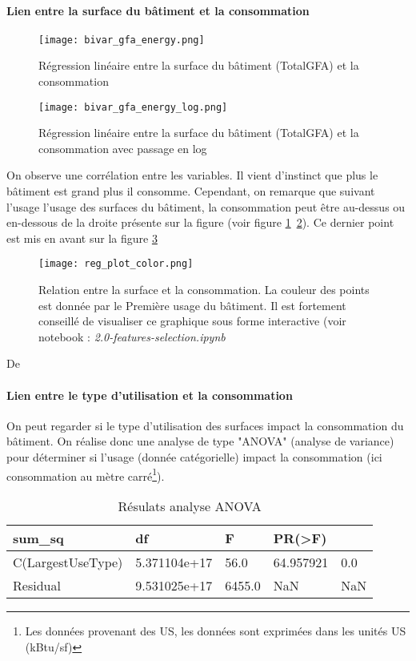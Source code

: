 \paragraph{Lien entre la surface du bâtiment et la consommation}

\begin{figure}[h!]
  \texttt{[image: bivar\_gfa\_energy.png]}
  \caption{Régression linéaire entre la surface du bâtiment (TotalGFA) et la
  consommation}
  \label{reg_1}
\end{figure}

\begin{figure}[h!]
  \texttt{[image: bivar\_gfa\_energy\_log.png]}
  \caption{Régression linéaire entre la surface du bâtiment (TotalGFA) et la
  consommation avec passage en log}
  \label{reg_2}
\end{figure}

On observe une corrélation entre les variables. Il vient d'instinct que plus
le bâtiment est grand plus il consomme. Cependant, on remarque que suivant l'usage
l'usage des surfaces du bâtiment, la consommation peut être au-dessus ou en-dessous
de la droite présente sur la figure (voir figure \ref{reg_1} \ref{reg_2}). Ce
dernier point est mis en avant sur la figure \ref{reg_3}

\begin{figure}[H]
  \texttt{[image: reg\_plot\_color.png]}
  \caption{Relation entre la surface et la consommation. La couleur des points
  est donnée par le Première usage du bâtiment. Il est fortement conseillé
  de visualiser ce graphique sous forme interactive (voir notebook : \emph{2.0-features-selection.ipynb}}
  \label{reg_3}
\end{figure}


De
\paragraph{Lien entre le type d'utilisation et la consommation}
On peut regarder si le type d'utilisation des surfaces impact la consommation du bâtiment.
On réalise donc une analyse de type "ANOVA" \cite{rutherford2001introducing}(analyse de variance) pour déterminer
si l'usage (donnée catégorielle) impact la consommation (ici consommation au mètre carré\footnote{Les données provenant des US, les données sont exprimées dans les unités US (kBtu/sf)}).

\begin{table*}[p]
  \caption{Résulats analyse ANOVA}
\begin{tabular}{@{}lllll@{}}
\toprule
sum\_sq                   & df           & F      & PR(\textgreater{}F) &     \\ \midrule
C(LargestUseType) & 5.371104e+17 & 56.0   & 64.957921           & 0.0 \\
Residual                  & 9.531025e+17 & 6455.0 & NaN                 & NaN \\ \bottomrule
\end{tabular}
\end{table*}

